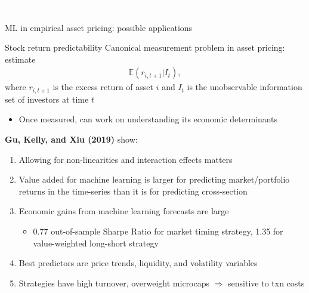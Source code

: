 \documentclass[xcolor=table, aspectratio=169]{beamer}
\newcommand{\alertbf}[1]{\alert{\textbf{#1}}}
\newcommand{\E}{\mathbb{E}}
\begin{document}
{
\begin{frame}
\begin{center}
\large{
\textcolor{white}{BREAK}    
}
\end{center}
\end{frame}
}

\begin{frame}{ML in empirical asset pricing: possible applications}
    
\end{frame}

\begin{frame}{Stock return predictability}
Canonical measurement problem in asset pricing: estimate
    \begin{align*}
        \E( r_{i,t+1} \vert I_t ),
    \end{align*}
    where $r_{i,t+1}$ is the excess return of asset $i$ and $I_t$ is the unobservable information set of investors at time $t$
    \begin{itemize}
        \item Once measured, can work on understanding its economic determinants
    \end{itemize}

    \vspace{6pt}
    
\alertbf{Gu, Kelly, and Xiu (2019)} show:
\begin{enumerate}
    \item Allowing for non-linearities and interaction effects matters
    \item Value added for machine learning is larger for predicting market/portfolio returns in the time-series than it is for predicting cross-section
    \item Economic gains from machine learning forecasts are large
    \begin{itemize}
        \item 0.77 out-of-sample Sharpe Ratio for market timing strategy, 1.35 for value-weighted long-short strategy
    \end{itemize}
    \item Best predictors are price trends, liquidity, and volatility variables
    \item Strategies have high turnover, overweight microcaps $\Rightarrow$ sensitive to txn costs
\end{enumerate}
\end{frame}
\end{document}
